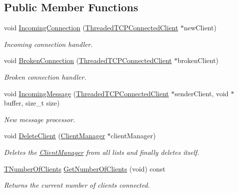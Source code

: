 \subsection*{Public Member Functions}
\begin{DoxyCompactItemize}
\item 
void \hyperlink{class_connection_manager_a54968c1176475aa513538691b75aedc9}{Incoming\-Connection} (\hyperlink{class_threaded_t_c_p_connected_client}{Threaded\-T\-C\-P\-Connected\-Client} $\ast$new\-Client)
\begin{DoxyCompactList}\small\item\em Incoming connection handler. \end{DoxyCompactList}\item 
void \hyperlink{class_connection_manager_a64473b0369ab91daf3a2da6b8ef576d0}{Broken\-Connection} (\hyperlink{class_threaded_t_c_p_connected_client}{Threaded\-T\-C\-P\-Connected\-Client} $\ast$broken\-Client)
\begin{DoxyCompactList}\small\item\em Broken connection handler. \end{DoxyCompactList}\item 
void \hyperlink{class_connection_manager_a4657b51054ad28143f1bddd1f5cc282c}{Incoming\-Message} (\hyperlink{class_threaded_t_c_p_connected_client}{Threaded\-T\-C\-P\-Connected\-Client} $\ast$sender\-Client, void $\ast$buffer, size\-\_\-t size)
\begin{DoxyCompactList}\small\item\em New message processor. \end{DoxyCompactList}\item 
void \hyperlink{class_connection_manager_afc67553cf1eff6ab251a5dd2a313e863}{Delete\-Client} (\hyperlink{class_client_manager}{Client\-Manager} $\ast$client\-Manager)
\begin{DoxyCompactList}\small\item\em Deletes the \hyperlink{class_client_manager}{Client\-Manager} from all lists and finally deletes itself. \end{DoxyCompactList}\item 
\hyperlink{class_connection_manager_a0f5f5b25b063cfebfac54b25cda131f7}{T\-Number\-Of\-Clients} \hyperlink{class_connection_manager_adf13721cde7ae4615aadbb5262f67274}{Get\-Number\-Of\-Clients} (void) const 
\begin{DoxyCompactList}\small\item\em Returns the current number of clients connected. \end{DoxyCompactList}\end{DoxyCompactItemize}
